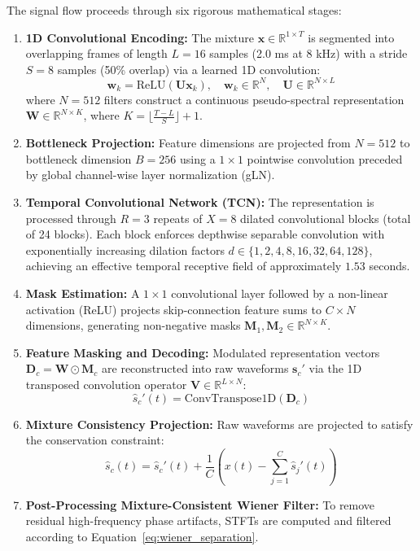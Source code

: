 \documentclass[11pt,a4paper]{report}
\begin{document}
The signal flow proceeds through six rigorous mathematical stages:
\begin{enumerate}
    \item \textbf{1D Convolutional Encoding:} The mixture $\mathbf{x} \in \mathbb{R}^{1 \times T}$ is segmented into overlapping frames of length $L=16$ samples (2.0 ms at 8 kHz) with a stride $S=8$ samples (50\% overlap) via a learned 1D convolution:
    \begin{equation}
        \mathbf{w}_k = \text{ReLU}(\mathbf{U} \mathbf{x}_k), \quad \mathbf{w}_k \in \mathbb{R}^N, \quad \mathbf{U} \in \mathbb{R}^{N \times L}
    \end{equation}
    where $N=512$ filters construct a continuous pseudo-spectral representation $\mathbf{W} \in \mathbb{R}^{N \times K}$, where $K = \lfloor \frac{T - L}{S} \rfloor + 1$.
    \item \textbf{Bottleneck Projection:} Feature dimensions are projected from $N=512$ to bottleneck dimension $B=256$ using a $1\times 1$ pointwise convolution preceded by global channel-wise layer normalization (gLN).
    \item \textbf{Temporal Convolutional Network (TCN):} The representation is processed through $R=3$ repeats of $X=8$ dilated convolutional blocks (total of 24 blocks). Each block enforces depthwise separable convolution with exponentially increasing dilation factors $d \in \{1, 2, 4, 8, 16, 32, 64, 128\}$, achieving an effective temporal receptive field of approximately $1.53$ seconds.
    \item \textbf{Mask Estimation:} A $1 \times 1$ convolutional layer followed by a non-linear activation (ReLU) projects skip-connection feature sums to $C \times N$ dimensions, generating non-negative masks $\mathbf{M}_1, \mathbf{M}_2 \in \mathbb{R}^{N \times K}$.
    \item \textbf{Feature Masking and Decoding:} Modulated representation vectors $\mathbf{D}_c = \mathbf{W} \odot \mathbf{M}_c$ are reconstructed into raw waveforms $\mathbf{s}_c'$ via the 1D transposed convolution operator $\mathbf{V} \in \mathbb{R}^{L \times N}$:
    \begin{equation}
        \hat{s}_c'(t) = \text{ConvTranspose1D}(\mathbf{D}_c)
    \end{equation}
    \item \textbf{Mixture Consistency Projection:} Raw waveforms are projected to satisfy the conservation constraint:
    \begin{equation}
        \hat{s}_c(t) = \hat{s}_c'(t) + \frac{1}{C} \left( x(t) - \sum_{j=1}^C \hat{s}_j'(t) \right)
        \label{eq:mixture_consistency}
    \end{equation}
    \item \textbf{Post-Processing Mixture-Consistent Wiener Filter:} To remove residual high-frequency phase artifacts, STFTs are computed and filtered according to Equation~\ref{eq:wiener_separation}.
\end{enumerate}
\end{document}
